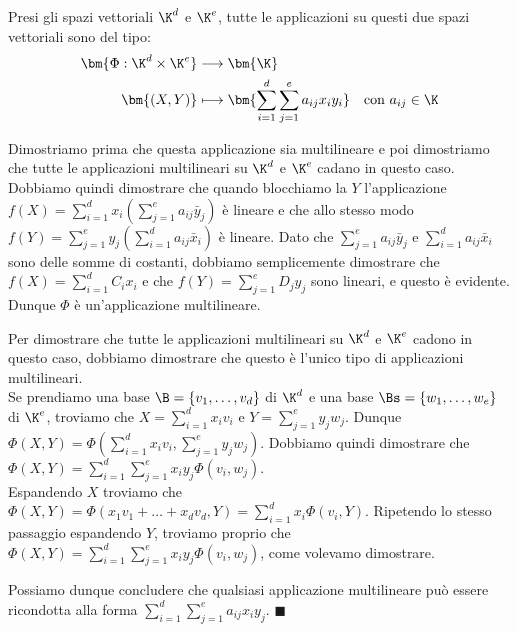 \documentclass[11pt, a4paper, titlepage, oneside]{scrbook}
\begin{document}
\begin{Proposizione}[]
\label{propos-applicaz-multilineari-tutte-uguali}
Presi gli spazi vettoriali $\K^d$ e $\K^e$, tutte le applicazioni su questi due spazi vettoriali sono del tipo:
\begin{align*}
\bm{\Phi: \K^d \times \K^e} &\longrightarrow \bm{\K} \\
\bm{(X, Y)} &\longmapsto \bm{\sum_{i = 1}^d \sum_{j = 1}^e a_{ij} x_i y_i} \quad \text{con } a_{ij} \in \K
\end{align*}
\end{Proposizione}

\Dimostrazione \nopagebreak

Dimostriamo prima che questa applicazione sia multilineare e poi dimostriamo che tutte le applicazioni multilineari su $\K^d$ e $\K^e$ cadano in questo caso.\\ 
Dobbiamo quindi dimostrare che quando blocchiamo la $Y$ l'applicazione $f(X) = \sum_{i = 1}^d x_i (\sum_{j = 1}^e a_{ij} \bar{y}_j)$ è lineare e che allo stesso modo $f(Y) = \sum_{j = 1}^e y_j (\sum_{i = 1}^d a_{ij} \bar{x}_i)$ è lineare. Dato che $\sum_{j = 1}^e a_{ij} \bar{y}_j$ e $\sum_{i = 1}^d a_{ij} \bar{x}_i$ sono delle somme di costanti, dobbiamo semplicemente dimostrare che $f(X) = \sum_{i = 1}^d C_i x_i$ e che $f(Y) = \sum_{j = 1}^e D_j y_j$ sono lineari, e questo è evidente. Dunque $\Phi$ è un'applicazione multilineare. 

Per dimostrare che tutte le applicazioni multilineari su $\K^d$ e $\K^e$ cadono in questo caso, dobbiamo dimostrare che questo è l'unico tipo di applicazioni multilineari. \\
Se prendiamo una base $\B = \{v_1, \ldots, v_d\}$ di $\K^d$ e una base $\Bs = \{w_1, \ldots, w_e\}$ di $\K^e$, troviamo che $X = \sum_{i = 1}^d x_i v_i$ e $Y = \sum_{j = 1}^e y_j w_j$. Dunque $\Phi(X, Y) = \Phi(\sum_{i = 1}^d x_i v_i, \sum_{j = 1}^e y_j w_j)$. Dobbiamo quindi dimostrare che $\Phi(X, Y) = \sum_{i = 1}^d \sum_{j = 1}^e x_i y_j \Phi(v_i, w_j)$. \\
Espandendo $X$ troviamo che $\Phi(X,Y) = \Phi(x_1 v_1 + \ldots + x_d v_d, Y) =  \sum_{i = 1}^d x_i \Phi(v_i, Y)$. Ripetendo lo stesso passaggio espandendo $Y$, troviamo proprio che \mbox{$\Phi(X, Y) = \sum_{i = 1}^d \sum_{j = 1}^e x_i y_j \Phi(v_i, w_j)$}, come volevamo dimostrare.

Possiamo dunque concludere che qualsiasi applicazione multilineare può essere ricondotta alla forma $\sum_{i = 1}^d \sum_{j = 1}^e a_{ij} x_i y_j$. $\blacksquare$
\end{document}
